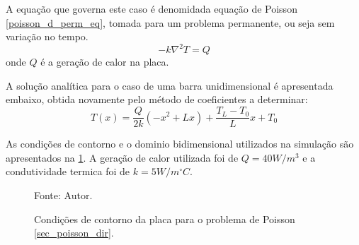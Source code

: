 A equação que governa este caso é denomidada equação de Poisson \eqref{poisson_d_perm_eq}, tomada para um problema permanente, ou seja sem variação no tempo.
\begin{equation}
    -k\nabla^2 T = Q
    \label{poisson_d_perm_eq} 
\end{equation}
onde $Q$ é a geração de calor na placa.

A solução analítica para o caso de uma barra unidimensional é apresentada embaixo, obtida novamente pelo método de coeficientes a determinar:
\begin{equation}
    T(x) = \dfrac{Q}{2k}\left(-x^2 + L x\right) + \dfrac{T_L-T_0}{L} x + T_0
    \label{poisson_d_sol} 
\end{equation}

As condições de contorno e o dominio bidimensional utilizados na simulação são apresentados na \ref{poisson_d_bc}.
A geração de calor utilizada foi de $Q = 40W/m^3$ e a condutividade termica foi de $k=5 W/m^{\circ}C$.
\begin{figure}[H]
    \centering
     {\raggedleft \scriptsize Fonte: Autor.}
    \caption{Condições de contorno da placa para o problema de Poisson \ref{sec_poisson_dir}.}
    \label{poisson_d_bc}
\end{figure}


